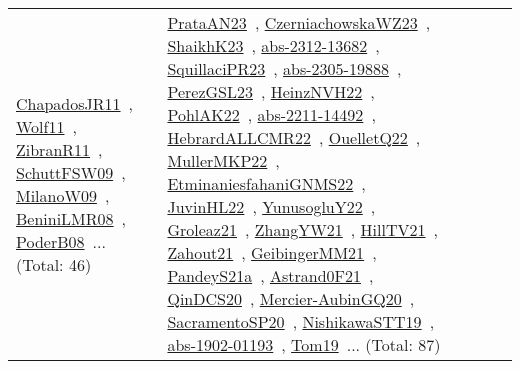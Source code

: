 {\begin{longtable}{lp{3cm}>{\raggedright\arraybackslash}p{6cm}>{\raggedright\arraybackslash}p{6cm}>{\raggedright\arraybackslash}p{8cm}}
\href{works/ChapadosJR11.pdf}{ChapadosJR11}~\cite{ChapadosJR11}, \href{works/Wolf11.pdf}{Wolf11}~\cite{Wolf11}, \href{works/ZibranR11.pdf}{ZibranR11}~\cite{ZibranR11}, \href{works/SchuttFSW09.pdf}{SchuttFSW09}~\cite{SchuttFSW09}, \href{works/MilanoW09.pdf}{MilanoW09}~\cite{MilanoW09}, \href{works/BeniniLMR08.pdf}{BeniniLMR08}~\cite{BeniniLMR08}, \href{works/PoderB08.pdf}{PoderB08}~\cite{PoderB08}... (Total: 46) & \href{works/PrataAN23.pdf}{PrataAN23}~\cite{PrataAN23}, \href{works/CzerniachowskaWZ23.pdf}{CzerniachowskaWZ23}~\cite{CzerniachowskaWZ23}, \href{works/ShaikhK23.pdf}{ShaikhK23}~\cite{ShaikhK23}, \href{works/abs-2312-13682.pdf}{abs-2312-13682}~\cite{abs-2312-13682}, \href{works/SquillaciPR23.pdf}{SquillaciPR23}~\cite{SquillaciPR23}, \href{works/abs-2305-19888.pdf}{abs-2305-19888}~\cite{abs-2305-19888}, \href{works/PerezGSL23.pdf}{PerezGSL23}~\cite{PerezGSL23}, \href{works/HeinzNVH22.pdf}{HeinzNVH22}~\cite{HeinzNVH22}, \href{works/PohlAK22.pdf}{PohlAK22}~\cite{PohlAK22}, \href{works/abs-2211-14492.pdf}{abs-2211-14492}~\cite{abs-2211-14492}, \href{works/HebrardALLCMR22.pdf}{HebrardALLCMR22}~\cite{HebrardALLCMR22}, \href{works/OuelletQ22.pdf}{OuelletQ22}~\cite{OuelletQ22}, \href{works/MullerMKP22.pdf}{MullerMKP22}~\cite{MullerMKP22}, \href{works/EtminaniesfahaniGNMS22.pdf}{EtminaniesfahaniGNMS22}~\cite{EtminaniesfahaniGNMS22}, \href{works/JuvinHL22.pdf}{JuvinHL22}~\cite{JuvinHL22}, \href{works/YunusogluY22.pdf}{YunusogluY22}~\cite{YunusogluY22}, \href{works/Groleaz21.pdf}{Groleaz21}~\cite{Groleaz21}, \href{works/ZhangYW21.pdf}{ZhangYW21}~\cite{ZhangYW21}, \href{works/HillTV21.pdf}{HillTV21}~\cite{HillTV21}, \href{works/Zahout21.pdf}{Zahout21}~\cite{Zahout21}, \href{works/GeibingerMM21.pdf}{GeibingerMM21}~\cite{GeibingerMM21}, \href{works/PandeyS21a.pdf}{PandeyS21a}~\cite{PandeyS21a}, \href{works/Astrand0F21.pdf}{Astrand0F21}~\cite{Astrand0F21}, \href{works/QinDCS20.pdf}{QinDCS20}~\cite{QinDCS20}, \href{works/Mercier-AubinGQ20.pdf}{Mercier-AubinGQ20}~\cite{Mercier-AubinGQ20}, \href{works/SacramentoSP20.pdf}{SacramentoSP20}~\cite{SacramentoSP20}, \href{works/NishikawaSTT19.pdf}{NishikawaSTT19}~\cite{NishikawaSTT19}, \href{works/abs-1902-01193.pdf}{abs-1902-01193}~\cite{abs-1902-01193}, \href{works/Tom19.pdf}{Tom19}~\cite{Tom19}... (Total: 87)\\

\end{longtable}}
